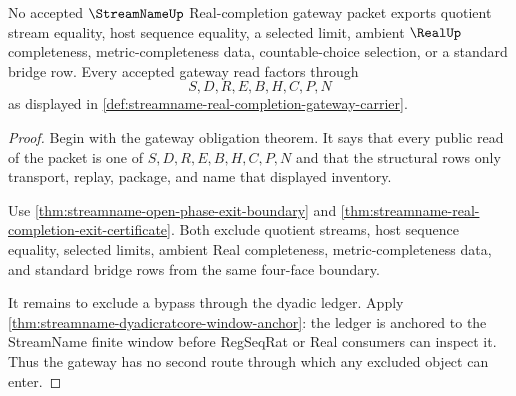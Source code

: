 \begin{theorem}
\label{thm:streamname-real-completion-gateway-nonescape}
No accepted $\StreamNameUp$ Real-completion gateway packet exports quotient stream equality, host sequence equality, a selected limit, ambient $\RealUp$ completeness, metric-completeness data, countable-choice selection, or a standard bridge row. Every accepted gateway read factors through
$$
S,D,R,E,B,H,C,P,N
$$
as displayed in \autoref{def:streamname-real-completion-gateway-carrier}.
\end{theorem}
\begin{proof}
Begin with the gateway obligation theorem. It says that every public read of the packet is one of $S,D,R,E,B,H,C,P,N$ and that the structural rows only transport, replay, package, and name that displayed inventory.

Use \autoref{thm:streamname-open-phase-exit-boundary} and \autoref{thm:streamname-real-completion-exit-certificate}. Both exclude quotient streams, host sequence equality, selected limits, ambient Real completeness, metric-completeness data, and standard bridge rows from the same four-face boundary.

It remains to exclude a bypass through the dyadic ledger. Apply \autoref{thm:streamname-dyadicratcore-window-anchor}: the ledger is anchored to the StreamName finite window before RegSeqRat or Real consumers can inspect it. Thus the gateway has no second route through which any excluded object can enter.
\end{proof}


